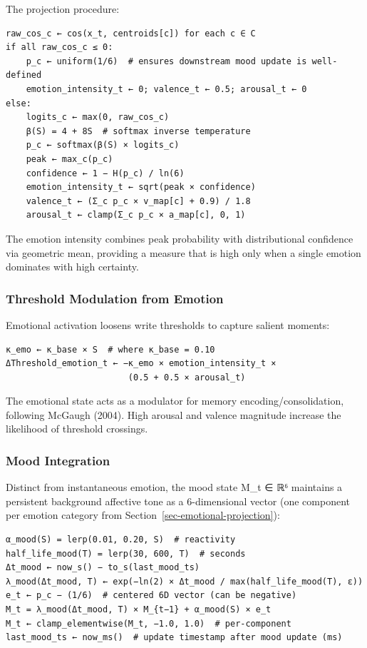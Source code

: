 \documentclass[
  letterpaper,
  DIV=11,
  numbers=noendperiod]{scrartcl}
\begin{document}
The projection procedure:

\begin{verbatim}
raw_cos_c ← cos(x_t, centroids[c]) for each c ∈ C
if all raw_cos_c ≤ 0:
    p_c ← uniform(1/6)  # ensures downstream mood update is well-defined
    emotion_intensity_t ← 0; valence_t ← 0.5; arousal_t ← 0
else:
    logits_c ← max(0, raw_cos_c)
    β(S) = 4 + 8S  # softmax inverse temperature
    p_c ← softmax(β(S) × logits_c)
    peak ← max_c(p_c)
    confidence ← 1 − H(p_c) / ln(6)
    emotion_intensity_t ← sqrt(peak × confidence)
    valence_t ← (Σ_c p_c × v_map[c] + 0.9) / 1.8
    arousal_t ← clamp(Σ_c p_c × a_map[c], 0, 1)
\end{verbatim}

The emotion intensity combines peak probability with distributional
confidence via geometric mean, providing a measure that is high only
when a single emotion dominates with high certainty.

\subsubsection{Threshold Modulation from
Emotion}\label{sec-emotional-threshold}

Emotional activation loosens write thresholds to capture salient
moments:

\begin{verbatim}
κ_emo ← κ_base × S  # where κ_base = 0.10
ΔThreshold_emotion_t ← −κ_emo × emotion_intensity_t ×
                        (0.5 + 0.5 × arousal_t)
\end{verbatim}

The emotional state acts as a modulator for memory
encoding/consolidation, following McGaugh (2004). High arousal and
valence magnitude increase the likelihood of threshold crossings.

\subsubsection{Mood Integration}\label{sec-mood}

Distinct from instantaneous emotion, the mood state M\_t ∈ ℝ⁶ maintains
a persistent background affective tone as a 6-dimensional vector (one
component per emotion category from
Section~\ref{sec-emotional-projection}):

\begin{verbatim}
α_mood(S) = lerp(0.01, 0.20, S)  # reactivity
half_life_mood(T) = lerp(30, 600, T)  # seconds
Δt_mood ← now_s() − to_s(last_mood_ts)
λ_mood(Δt_mood, T) ← exp(−ln(2) × Δt_mood / max(half_life_mood(T), ε))
e_t ← p_c − (1/6)  # centered 6D vector (can be negative)
M_t = λ_mood(Δt_mood, T) × M_{t−1} + α_mood(S) × e_t
M_t ← clamp_elementwise(M_t, −1.0, 1.0)  # per-component
last_mood_ts ← now_ms()  # update timestamp after mood update (ms)
\end{verbatim}
\end{document}
